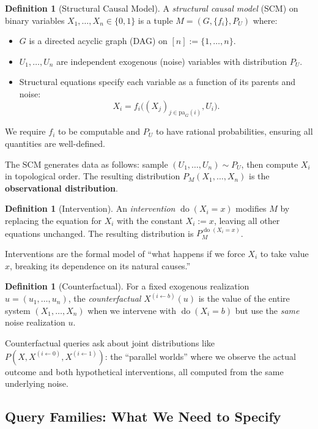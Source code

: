 \documentclass{article}
\theoremstyle{plain}
\theoremstyle{definition}
\newtheorem{definition}[theorem]{Definition}
\newcommand{\pa}{\mathrm{pa}}
\DeclareMathOperator{\doop}{do}
\begin{document}
\begin{definition}[Structural Causal Model]
A \emph{structural causal model} (SCM) on binary variables $X_1, \ldots, X_n \in \{0,1\}$ is a tuple $M = (G, \{f_i\}, P_U)$ where:
\begin{itemize}
    \item $G$ is a directed acyclic graph (DAG) on $[n] := \{1, \ldots, n\}$.
    \item $U_1, \ldots, U_n$ are independent exogenous (noise) variables with distribution $P_U$.
    \item Structural equations specify each variable as a function of its parents and noise:
    \[
    X_i = f_i\bigl( (X_j)_{j \in \pa_G(i)}, U_i \bigr).
    \]
\end{itemize}
We require $f_i$ to be computable and $P_U$ to have rational probabilities, ensuring all quantities are well-defined.
\end{definition}

The SCM generates data as follows: sample $(U_1, \ldots, U_n) \sim P_U$, then compute $X_i$ in topological order. The resulting distribution $P_M(X_1, \ldots, X_n)$ is the \textbf{observational distribution}.

\begin{definition}[Intervention]
An \emph{intervention} $\doop(X_i = x)$ modifies $M$ by replacing the equation for $X_i$ with the constant $X_i := x$, leaving all other equations unchanged. The resulting distribution is $P_M^{\doop(X_i = x)}$.
\end{definition}

Interventions are the formal model of ``what happens if we force $X_i$ to take value $x$, breaking its dependence on its natural causes.''

\begin{definition}[Counterfactual]
For a fixed exogenous realization $u = (u_1, \ldots, u_n)$, the \emph{counterfactual} $X^{(i \leftarrow b)}(u)$ is the value of the entire system $(X_1, \ldots, X_n)$ when we intervene with $\doop(X_i = b)$ but use the \emph{same} noise realization $u$.

Counterfactual queries ask about joint distributions like $P(X, X^{(i \leftarrow 0)}, X^{(i \leftarrow 1)})$: the ``parallel worlds'' where we observe the actual outcome and both hypothetical interventions, all computed from the same underlying noise.
\end{definition}

\subsection{Query Families: What We Need to Specify}
\label{sec:query-families}
\end{document}
